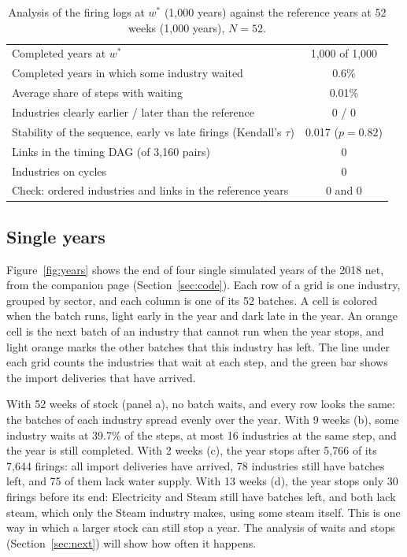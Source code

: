 \documentclass[11pt]{article}
\begin{document}
\begin{table}[htbp]
\centering\small
\caption{Analysis of the firing logs at $w^*$ (1{,}000 years) against the reference years at 52 weeks (1{,}000 years), $N=52$.}
\label{tab:order}
\begin{tabularx}{0.8\textwidth}{@{}Lc@{}}
\toprule
Completed years at $w^*$ & 1{,}000 of 1{,}000\\
Completed years in which some industry waited & 0.6\%\\
Average share of steps with waiting & 0.01\%\\
\addlinespace
Industries clearly earlier / later than the reference & 0 / 0\\
Stability of the sequence, early vs late firings (Kendall's $\tau$) & 0.017 ($p=0.82$)\\
\addlinespace
Links in the timing DAG (of 3{,}160 pairs) & 0\\
Industries on cycles & 0\\
Check: ordered industries and links in the reference years & 0 and 0\\
\bottomrule
\end{tabularx}
\end{table}

\subsection{Single years}

Figure~\ref{fig:years} shows the end of four single simulated years of the 2018 net, from the companion page (Section~\ref{sec:code}). Each row of a grid is one industry, grouped by sector, and each column is one of its 52 batches. A cell is colored when the batch runs, light early in the year and dark late in the year. An orange cell is the next batch of an industry that cannot run when the year stops, and light orange marks the other batches that this industry has left. The line under each grid counts the industries that wait at each step, and the green bar shows the import deliveries that have arrived.

With 52 weeks of stock (panel a), no batch waits, and every row looks the same: the batches of each industry spread evenly over the year. With 9 weeks (b), some industry waits at 39.7\% of the steps, at most 16 industries at the same step, and the year is still completed. With 2 weeks (c), the year stops after 5{,}766 of its 7{,}644 firings: all import deliveries have arrived, 78 industries still have batches left, and 75 of them lack water supply. With 13 weeks (d), the year stops only 30 firings before its end: Electricity and Steam still have batches left, and both lack steam, which only the Steam industry makes, using some steam itself. This is one way in which a larger stock can still stop a year. The analysis of waits and stops (Section~\ref{sec:next}) will show how often it happens.
\end{document}

